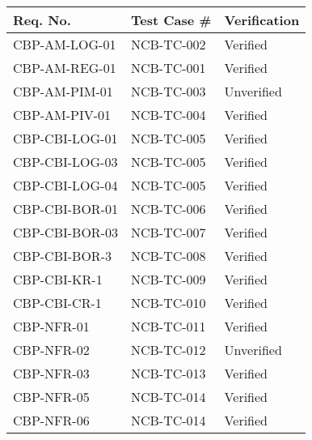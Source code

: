 \documentclass{article}
\begin{document}
\begin{tabularx}{\textwidth}{| X | X | X |}
	\hline
	Req. No.       & Test Case \# & Verification \\ \hline
	CBP-AM-LOG-01  & NCB-TC-002   & Verified     \\ \hline
	CBP-AM-REG-01  & NCB-TC-001   & Verified     \\ \hline
	CBP-AM-PIM-01  & NCB-TC-003   & Unverified   \\ \hline
	CBP-AM-PIV-01  & NCB-TC-004   & Verified     \\ \hline
	CBP-CBI-LOG-01 & NCB-TC-005   & Verified     \\ \hline
	CBP-CBI-LOG-03 & NCB-TC-005   & Verified     \\ \hline
	CBP-CBI-LOG-04 & NCB-TC-005   & Verified     \\ \hline
	CBP-CBI-BOR-01 & NCB-TC-006   & Verified     \\ \hline
	CBP-CBI-BOR-03 & NCB-TC-007   & Verified     \\ \hline
	CBP-CBI-BOR-3  & NCB-TC-008   & Verified     \\ \hline
	CBP-CBI-KR-1   & NCB-TC-009   & Verified     \\ \hline
	CBP-CBI-CR-1   & NCB-TC-010   & Verified     \\ \hline
	CBP-NFR-01     & NCB-TC-011   & Verified     \\ \hline
	CBP-NFR-02     & NCB-TC-012   & Unverified   \\ \hline
	CBP-NFR-03     & NCB-TC-013   & Verified     \\ \hline
	CBP-NFR-05     & NCB-TC-014   & Verified     \\ \hline
	CBP-NFR-06     & NCB-TC-014   & Verified     \\ \hline
\end{tabularx}
\end{document}
